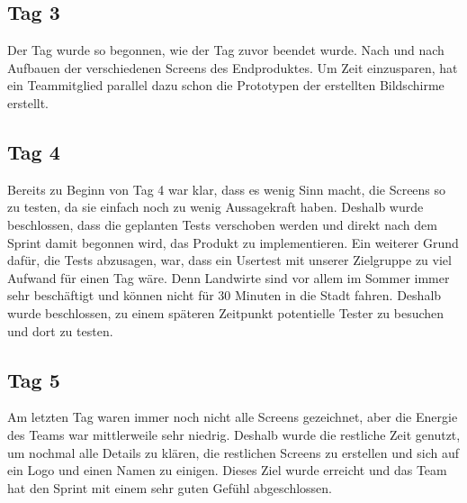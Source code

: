 \subsection*{Tag 3}
Der Tag wurde so begonnen, wie der Tag zuvor beendet wurde. Nach und nach Aufbauen der verschiedenen Screens des Endproduktes. Um Zeit einzusparen, hat ein Teammitglied parallel dazu schon die Prototypen der erstellten Bildschirme erstellt.

\subsection*{Tag 4}
Bereits zu Beginn von Tag 4 war klar, dass es wenig Sinn macht, die Screens so zu testen, da sie einfach noch zu wenig Aussagekraft haben. Deshalb wurde beschlossen, dass die geplanten Tests verschoben werden und direkt nach dem Sprint damit begonnen wird, das Produkt zu implementieren. Ein weiterer Grund dafür, die Tests abzusagen, war, dass ein Usertest mit unserer Zielgruppe zu viel Aufwand für einen Tag wäre. Denn Landwirte sind vor allem im Sommer immer sehr beschäftigt und können nicht für 30 Minuten in die Stadt fahren. Deshalb wurde beschlossen, zu einem späteren Zeitpunkt potentielle Tester zu besuchen und dort zu testen.

\subsection*{Tag 5}
Am letzten Tag waren immer noch nicht alle Screens gezeichnet, aber die Energie des Teams war mittlerweile sehr niedrig. Deshalb wurde die restliche Zeit genutzt, um nochmal alle Details zu klären, die restlichen Screens zu erstellen und sich auf ein Logo und einen Namen zu einigen. Dieses Ziel wurde erreicht und das Team hat den Sprint mit einem sehr guten Gefühl abgeschlossen.

